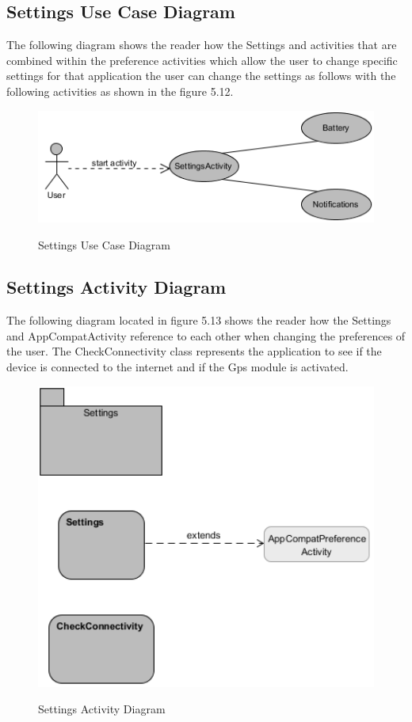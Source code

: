 \subsection{Settings Use Case Diagram}
The following diagram shows the reader how the Settings and activities that are combined within the preference activities which allow the user to change specific settings for that application the user can change the settings as follows with the following activities as shown in the figure 5.12.\par

\begin{figure}[htbp]
    \center \includegraphics[width=450pt]{SettingsUsecase}\\
    \caption{Settings Use Case Diagram} \label{Figure: Settings Use Case Diagram }
\end{figure}

\subsection{Settings Activity Diagram}
The following diagram located in figure 5.13 shows the reader how the Settings and AppCompatActivity reference to each other when changing the preferences of the user. The CheckConnectivity class represents the application to see if the device is connected to the internet and if the Gps module is activated.

\begin{figure}[htbp]
    \center \includegraphics[width=350pt]{SettingsActivity}\\
    \caption{Settings Activity Diagram} \label{Figure: Settings Activity Diagram }
\end{figure}

